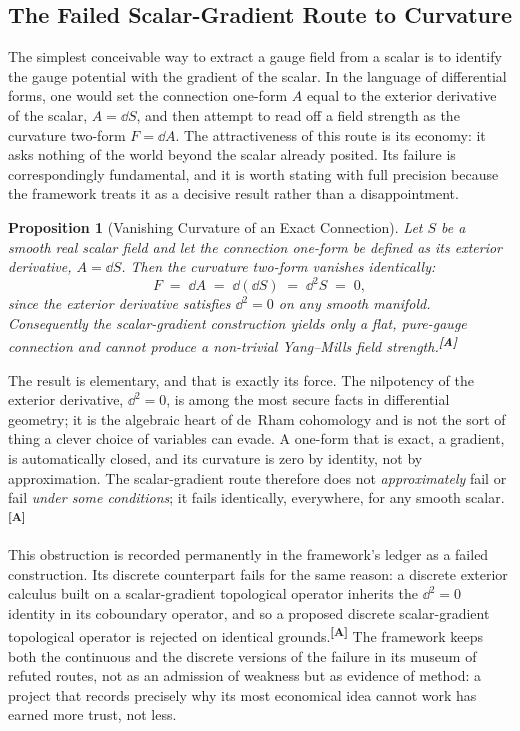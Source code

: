 \documentclass[12pt,a4paper,twoside]{article}
\theoremstyle{plain}
\newtheorem{proposition}[theorem]{Proposition}
\theoremstyle{definition}
\theoremstyle{remark}
\newcommand{\catmark}[1]{\textsuperscript{\textsf{\textbf{[#1]}}}}
\begin{document}
\subsection{The Failed Scalar-Gradient Route to Curvature}
\label{subsec:failed-scalar-gradient}

The simplest conceivable way to extract a gauge field from a scalar is to identify the gauge potential with the gradient of the scalar. In the language of differential forms, one would set the connection one-form $A$ equal to the exterior derivative of the scalar, $A = \dd S$, and then attempt to read off a field strength as the curvature two-form $F = \dd A$. The attractiveness of this route is its economy: it asks nothing of the world beyond the scalar already posited. Its failure is correspondingly fundamental, and it is worth stating with full precision because the framework treats it as a decisive result rather than a disappointment.

\begin{proposition}[Vanishing Curvature of an Exact Connection]
\label{prop:d2-obstruction}
Let $S$ be a smooth real scalar field and let the connection one-form be defined as its exterior derivative, $A = \dd S$. Then the curvature two-form vanishes identically:
\[
 F \;=\; \dd A \;=\; \dd(\dd S) \;=\; \dd^2 S \;=\; 0,
\]
since the exterior derivative satisfies $\dd^2 = 0$ on any smooth manifold. Consequently the scalar-gradient construction yields only a flat, pure-gauge connection and cannot produce a non-trivial Yang--Mills field strength.\catmark{A}
\end{proposition}

\noindent The result is elementary, and that is exactly its force. The nilpotency of the exterior derivative, $\dd^2 = 0$, is among the most secure facts in differential geometry; it is the algebraic heart of de~Rham cohomology and is not the sort of thing a clever choice of variables can evade. A one-form that is exact, a gradient, is automatically closed, and its curvature is zero by identity, not by approximation. The scalar-gradient route therefore does not \emph{approximately} fail or fail \emph{under some conditions}; it fails identically, everywhere, for any smooth scalar.\catmark{A}

This obstruction is recorded permanently in the framework's ledger as a failed construction. Its discrete counterpart fails for the same reason: a discrete exterior calculus built on a scalar-gradient topological operator inherits the $\dd^2 = 0$ identity in its coboundary operator, and so a proposed discrete scalar-gradient topological operator is rejected on identical grounds.\catmark{A} The framework keeps both the continuous and the discrete versions of the failure in its museum of refuted routes, not as an admission of weakness but as evidence of method: a project that records precisely why its most economical idea cannot work has earned more trust, not less.
\end{document}
